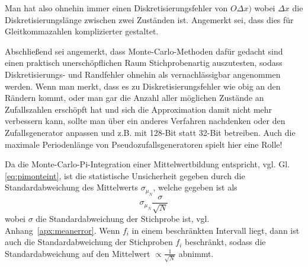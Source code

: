\documentclass[german,bibnum,beleg,zihtitle,german,hyperref,utf8]{zihpub}
\begin{document}
Man hat also ohnehin immer einen Diskretisierungsfehler von $O\Delta x)$ wobei $\Delta x$ die Diskretisierungslänge zwischen zwei Zuständen ist. Angemerkt sei, dass dies für Gleitkommazahlen komplizierter gestaltet.

Abschließend sei angemerkt, dass Monte-Carlo-Methoden dafür gedacht sind einen praktisch unerschöpflichen Raum Stichprobenartig auszutesten, sodass Diskretisierungs- und Randfehler ohnehin als vernachlässigbar angenommen werden. Wenn man merkt, dass es zu Diskretisierungsfehler wie obig an den Rändern kommt, oder man gar die Anzahl aller möglichen Zustände an Zufallszahlen erschöpft hat und sich die Approximation damit nicht mehr verbessern kann, sollte man über ein anderes Verfahren nachdenken oder den Zufallsgenerator anpassen und z.B. mit 128-Bit statt 32-Bit betreiben. Auch die maximale Periodenlänge von Pseudozufallsgeneratoren spielt hier eine Rolle!
%

Da die Monte-Carlo-Pi-Integration einer Mittelwertbildung entspricht, vgl. Gl.\ref{eq:pimonteint}, ist die statistische Unsicherheit gegeben durch die Standardabweichung des Mittelwerts $\sigma_{\mu_N}$, welche gegeben ist als
\begin{equation}
	\sigma_{\mu_N} \frac{\sigma}{\sqrt{N}}
\end{equation}
wobei $\sigma$ die Standardabweichung der Stichprobe ist, vgl. Anhang~\ref{apx:meanerror}.
Wenn $f_i$ in einem beschränkten Intervall liegt, dann ist auch die Standardabweichung der Stichproben $f_i$ beschränkt, sodass die Standardabweichung auf den Mittelwert $\propto \frac{1}{\sqrt{N}}$ abnimmt.
\end{document}
